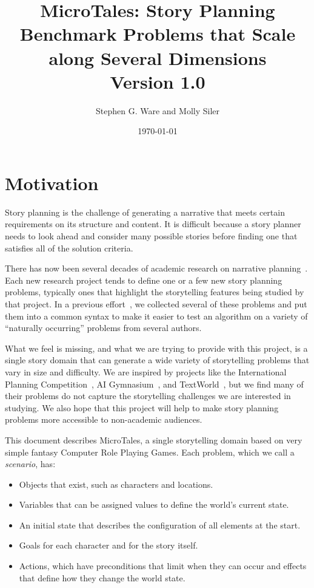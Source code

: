 \documentclass{nilreport}
\title{MicroTales: Story Planning Benchmark Problems that Scale along Several Dimensions\\{\large Version 1.0}}
\author{Stephen G. Ware and Molly Siler}
\date{\today}
\begin{document}
\maketitle

\tableofcontents

\newpage


\section{Motivation}

Story planning is the challenge of generating a narrative that meets certain requirements on its structure and content. It is difficult because a story planner needs to look ahead and consider many possible stories before finding one that satisfies all of the solution criteria.

There has now been several decades of academic research on narrative planning~\cite{young2013plans,kybartas2016survey}. Each new research project tends to define one or a few new story planning problems, typically ones that highlight the storytelling features being studied by that project. In a previous effort~\cite{ware2023collection}, we collected several of these problems and put them into a common syntax to make it easier to test an algorithm on a variety of ``naturally occurring'' problems from several authors.

What we feel is missing, and what we are trying to provide with this project, is a single story domain that can generate a wide variety of storytelling problems that vary in size and difficulty. We are inspired by projects like the International Planning Competition~\cite{taitler2023ipc}, AI Gymnasium~\cite{cote2019textworld}, and TextWorld~\cite{cote2019textworld}, but we find many of their problems do not capture the storytelling challenges we are interested in studying. We also hope that this project will help to make story planning problems more accessible to non-academic audiences.

This document describes MicroTales, a single storytelling domain based on very simple fantasy Computer Role Playing Games. Each problem, which we call a \emph{scenario}, has:
\begin{itemize}
	\item Objects that exist, such as characters and locations.
	\item Variables that can be assigned values to define the world's current state.
	\item An initial state that describes the configuration of all elements at the start.
  \item Goals for each character and for the story itself.
	\item Actions, which have preconditions that limit when they can occur and effects that define how they change the world state.
\end{itemize}
\end{document}
